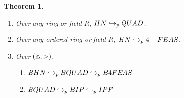 \documentclass[twoside]{article}
\newtheorem{theorem}{Theorem}[section]
\begin{document}
\begin{theorem}
  \begin{enumerate}
  \item Over any ring or field $R$, $HN \hookrightarrow_p QUAD$.
  \item Over any ordered ring or field $R$, $HN \hookrightarrow_p 4-FEAS$.
  \item Over $(\mathbb{Z}, >)$, 
    \begin{enumerate}
    \item $BHN \hookrightarrow_p BQUAD \hookrightarrow_p B4FEAS$
    \item $BQUAD \hookrightarrow_p BIP \hookrightarrow_p IPF$
    \end{enumerate}
  \end{enumerate}
\end{theorem}


\end{document}
